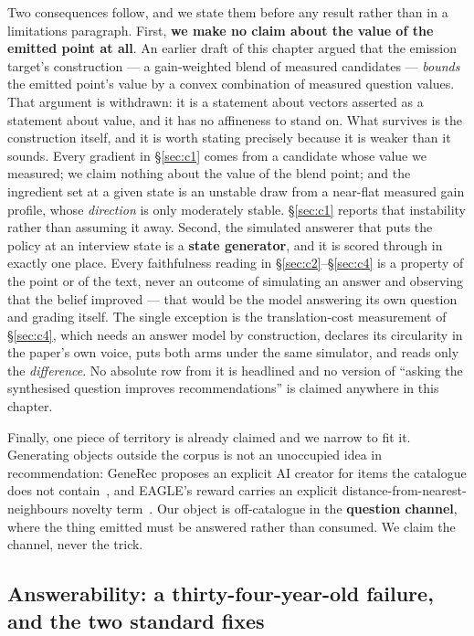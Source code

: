 \documentclass[11pt]{article}
\begin{document}
Two consequences follow, and we state them before any result rather than in a limitations paragraph.
First, \textbf{we make no claim about the value of the emitted point at all}. An earlier draft of
this chapter argued that the emission target's construction --- a gain-weighted blend of measured
candidates --- \emph{bounds} the emitted point's value by a convex combination of measured question
values. That argument is withdrawn: it is a statement about vectors asserted as a statement about
value, and it has no affineness to stand on. What survives is the construction itself, and it is
worth stating precisely because it is weaker than it sounds. Every gradient in \S\ref{sec:c1} comes
from a candidate whose value we measured; we claim nothing about the value of the blend point; and
the ingredient set at a given state is an unstable draw from a near-flat measured gain profile, whose
\emph{direction} is only moderately stable. \S\ref{sec:c1} reports that instability rather than
assuming it away. Second, the simulated answerer that puts the
policy at an interview state is a \textbf{state generator}, and it is scored through in exactly one
place. Every faithfulness reading in \S\ref{sec:c2}--\S\ref{sec:c4} is a property of the point or of
the text, never an outcome of simulating an answer and observing that the belief improved --- that
would be the model answering its own question and grading itself. The single exception is the
translation-cost measurement of \S\ref{sec:c4}, which needs an answer model by construction, declares
its circularity in the paper's own voice, puts both arms under the same simulator, and reads only the
\emph{difference}. No absolute row from it is headlined and no version of ``asking the synthesised
question improves recommendations'' is claimed anywhere in this chapter.

Finally, one piece of territory is already claimed and we narrow to fit it. Generating objects
outside the corpus is not an unoccupied idea in recommendation: GeneRec proposes an explicit AI
creator for items the catalogue does not contain~\cite{wang2023generec}, and EAGLE's reward carries
an explicit distance-from-nearest-neighbours novelty term~\cite{tennenholtz2024eagle}. Our object is
off-catalogue in the \textbf{question channel}, where the thing emitted must be answered rather than
consumed. We claim the channel, never the trick.

\subsection{Answerability: a thirty-four-year-old failure, and the two standard fixes}
\end{document}
